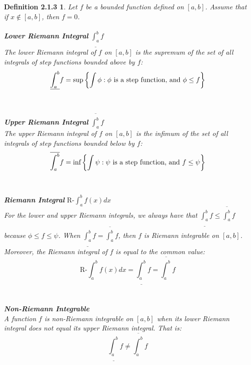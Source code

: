 \documentclass{article}
\theoremstyle{plain}
\newtheorem*{two_one_three_definition*}{Definition 2.1.3}
\begin{document}
\begin{two_one_three_definition*}
Let $f$ be a bounded function defined on $\left[a,b\right]$. Assume that if $ x \notin \left[a,b\right]$, then $ f = 0$.
\\ \\
\textbf{Lower Riemann Integral} \hspace{.25 em} $\underline{\int_{a}^{b}} f$ \\
The lower Riemann integral of $f$ on $\left[a,b\right]$ is the supremum of the set of all integrals of step functions bounded above by $f$:
$$
\underline{\int_{a}^{b}} f = \text{\rm{sup}} \left\{ \int \phi : \phi \text{ is a step function, and } \phi \leq f\right\}
$$
\\ \\
\textbf{Upper Riemann Integral} \hspace{.25 em} $ \overline{\int_{a}^{b}} f $ \\
The upper Riemann integral of $f$ on $\left[a,b\right]$ is the infimum of the set of all integrals of step functions bounded below by $f$:
$$
\overline{\int_{a}^{b}} f = \text{\rm{inf}} \left\{ \int \psi : \psi \text{ is a step function, and } f \leq \psi \right\}
$$
\\ \\
\textbf{Riemann Integral} \hspace{.25 em} $ \text{R-}\int_{a}^{b} f\left(x\right) dx $ \\
For the lower and upper Riemann integrals, we always have that $ \underline{\int_{a}^{b}} f \leq \overline{\int_{a}^{b}} f $ because $ \phi \leq f \leq \psi $. When $ \underline{\int_{a}^{b}} f = \overline{\int_{a}^{b}} f $, then $f$ is Riemann integrable on $\left[a,b\right]$. Moreover, the Riemann integral of $f$ is equal to the common value:
$$
\text{R-} \int_{a}^{b} f\left(x\right) dx = \underline{ \int_{a}^{b}} f = \overline{ \int_{a}^{b}} f
$$
\\ \\
\textbf{Non-Riemann Integrable} \\
A function $f$ is non-Riemann integrable on $\left[a,b\right]$ when its lower Riemann integral does not equal its upper Riemann integral. That is:
$$
\underline{ \int_{a}^{b}} f \neq \overline{ \int_{a}^{b}} f
$$
\end{two_one_three_definition*}
\end{document}
